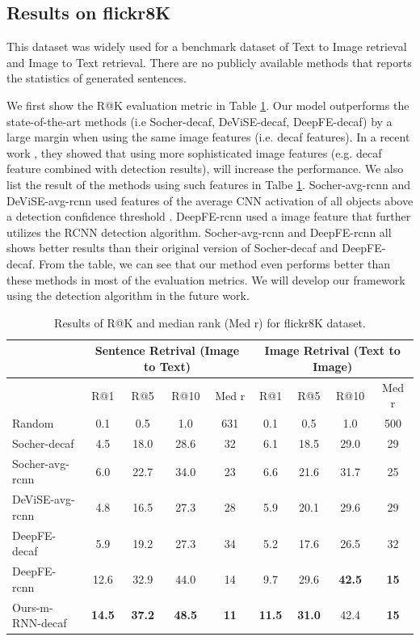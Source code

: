 \subsection{Results on flickr8K}

This dataset was widely used for a benchmark dataset of Text to Image retrieval and Image to Text retrieval.
There are no publicly available methods that reports the statistics of generated sentences.

We first show the R@K evaluation metric in Table \ref{tab:flickr8K_ret}.
Our model outperforms the state-of-the-art methods (i.e Socher-decaf, DeViSE-decaf, DeepFE-decaf) by a large margin when using the same image features (i.e. decaf features).
In a recent work \cite{karpathy2014fragment}, they showed that using more sophisticated image features (e.g. decaf feature combined with detection results), will increase the performance.
We also list the result of the methods using such features in Talbe \ref{tab:flickr8K_ret}.
Socher-avg-rcnn and DeViSE-avg-rcnn used features of the average CNN activation of all objects above a detection confidence threshold \cite{karpathy2014fragment}.
DeepFE-rcnn used a image feature that further utilizes the RCNN detection algorithm.
Socher-avg-rcnn and DeepFE-rcnn all shows better results than their original version of Socher-decaf and DeepFE-decaf.
From the table, we can see that our method even performs better than these methods in most of the evaluation metrics.
We will develop our framework using the detection algorithm in the future work.

\begin{table}[htb]
	\centering
\begin{tabular}{l|cccc|cccc}
\hline
      & \multicolumn{4}{c|}{Sentence Retrival (Image to Text)} & \multicolumn{4}{c}{Image Retrival (Text to Image)} \\
\hline
      & R@1   & R@5   & R@10  & Med r & R@1   & R@5   & R@10  & Med r \\
\hline
Random & 0.1   & 0.5   & 1.0   & 631   & 0.1   & 0.5   & 1.0   & 500 \\
Socher-decaf \cite{socher2014grounded} & 4.5   & 18.0  & 28.6  & 32    & 6.1   & 18.5  & 29.0  & 29 \\
Socher-avg-rcnn \cite{socher2014grounded} & 6.0   & 22.7  & 34.0  & 23    & 6.6   & 21.6  & 31.7  & 25 \\
DeViSE-avg-rcnn \cite{frome2013devise} & 4.8   & 16.5  & 27.3  & 28    & 5.9   & 20.1  & 29.6  & 29 \\
DeepFE-decaf \cite{karpathy2014fragment} & 5.9   & 19.2  & 27.3  & 34    & 5.2   & 17.6  & 26.5  & 32 \\
DeepFE-rcnn \cite{karpathy2014fragment} & 12.6  & 32.9  & 44.0  & 14    & 9.7   & 29.6  & \textbf{42.5} & \textbf{15} \\
Ours-m-RNN-decaf & \textbf{14.5} & \textbf{37.2} & \textbf{48.5} & \textbf{11} & \textbf{11.5} & \textbf{31.0} & 42.4  & \textbf{15}\\
\hline
\end{tabular}%
	\caption{Results of R@K and median rank (Med r) for flickr8K dataset.}
	\label{tab:flickr8K_ret}
\end{table}

